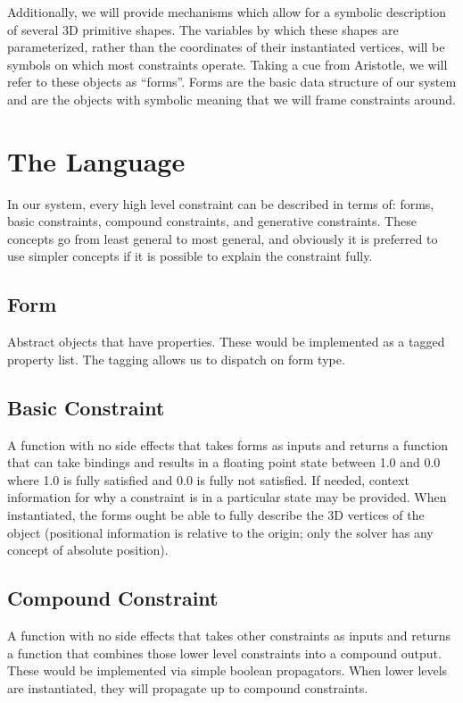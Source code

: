 \documentclass[a4paper,10pt]{article}
\begin{document}
Additionally, we will provide mechanisms which allow for a symbolic description 
of several 3D primitive shapes. The variables by which these shapes are 
parameterized, rather than the coordinates of their instantiated vertices, 
will be symbols on which most constraints operate. Taking a cue from 
Aristotle, we will refer to these objects as “forms”.  Forms are the basic data 
structure of our system and are the objects with symbolic meaning that we will 
frame constraints around.

\section{The Language}
In our system, every high level constraint can be described in terms of: 
forms, basic constraints, compound constraints, and generative constraints. 
These concepts go from least general to most general, and obviously it is 
preferred to use simpler concepts if it is possible to explain the constraint 
fully.

\subsection{Form}
Abstract objects that have properties.  These would be implemented as a tagged 
property list.  The tagging allows us to dispatch on form type.

\subsection{Basic Constraint}
A function with no side effects that takes forms as inputs and returns a 
function that can take bindings and results in a floating point state between 
1.0 and 0.0 where 1.0 is fully satisfied and 0.0 is fully not satisfied. If 
needed, context information for why a constraint is in a particular state may 
be provided.  When instantiated, the forms ought be able to fully describe the 
3D vertices of the object (positional information is relative to the origin; 
only the solver has any concept of absolute position). 

\subsection{Compound Constraint} A function with no side effects that takes 
other constraints as inputs and returns a function that combines those lower 
level constraints into a compound output.  These would be implemented via 
simple boolean propagators. When lower levels are instantiated, they will 
propagate up to compound constraints.
\end{document}
